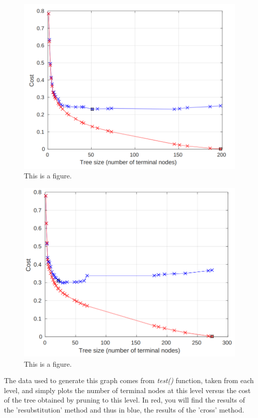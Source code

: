 \begin{figure}[h]
    \caption{This is a figure.}
    \begin{center}
  \includegraphics[scale = 0.40]{graphs/clean_dataset/clean_pruning.png}
 \end{center}
  \end{figure}


 \begin{figure}[h]
    \begin{center}
    \caption{This is a figure.}
  \includegraphics[scale = 0.40]{graphs/noisy_dataset/noisy_pruning.png} 
 \end{center}

  \end{figure}



The data used to generate this graph comes from \emph{test()} function,
taken from each level, and simply plots the number of terminal nodes at this level versus
the cost of the tree obtained by pruning to this level.
In red, you will find the results of the 'resubstitution' method and thus in blue, the results of the 'cross' method.


